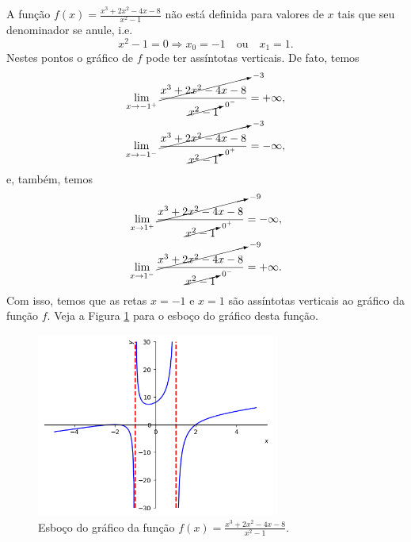 \begin{ex}
  A função $\displaystyle f(x) = \frac{x^3 + 2x^2 - 4x - 8}{x^2 - 1}$ não está definida para valores de $x$ tais que seu denominador se anule, i.e.
    \begin{equation}
      x^2 - 1 = 0 \Rightarrow x_0=-1\quad\text{ou}\quad x_1=1.
    \end{equation}
    Nestes pontos o gráfico de $f$ pode ter assíntotas verticais. De fato, temos
    \begin{align}
      \lim_{x\to -1^+} \frac{\cancelto{-3}{x^3 + 2x^2 - 4x - 8}}{\cancelto{0^-}{x^2-1}} &=  +\infty,\\
      \lim_{x\to -1^-} \frac{\cancelto{-3}{x^3 + 2x^2 - 4x - 8}}{\cancelto{0^+}{x^2-1}} &=  -\infty,
    \end{align}
    e, também, temos
    \begin{align}
      \lim_{x\to 1^+} \frac{\cancelto{-9}{x^3 + 2x^2 - 4x - 8}}{\cancelto{0^+}{x^2-1}} &= -\infty,\\      
      \lim_{x\to 1^-} \frac{\cancelto{-9}{x^3 + 2x^2 - 4x - 8}}{\cancelto{0^-}{x^2-1}} &= +\infty.
    \end{align}
    Com isso, temos que as retas $x=-1$ e $x=1$ são assíntotas verticais ao gráfico da função $f$. Veja a Figura \ref{fig:ex_lim_assvert_racio} para o esboço do gráfico desta função.

    \begin{figure}[H]
      \centering
      \includegraphics[width=0.7\textwidth]{./cap_lim/dados/fig_ex_lim_assvert_racio/fig_ex_lim_assvert_racio}
      \caption{Esboço do gráfico da função $\displaystyle f(x) = \frac{x^3 + 2x^2 - 4x - 8}{x^2 - 1}$.}
      \label{fig:ex_lim_assvert_racio}
    \end{figure}
\end{ex}

